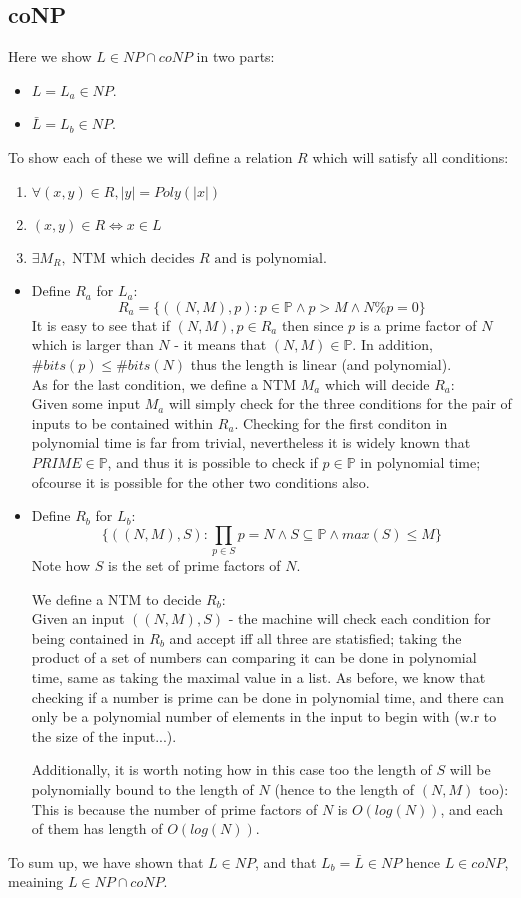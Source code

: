 \subsection{coNP}
Here we show $L\in NP\cap coNP$ in two parts:
\begin{itemize}
	\item $L=L_a\in NP$.
	\item $\bar{L}=L_b\in NP$.
\end{itemize}
To show each of these we will define a relation $R$ which will satisfy all
conditions:
\begin{enumerate}
	\item $\forall(x,y)\in R, |y|=Poly(|x|)$
	\item $(x,y)\in R \Leftrightarrow x\in L$
	\item $\exists M_R, \text{ NTM which decides } R \text{ and is polynomial}$.
\end{enumerate}
\begin{itemize}
	\item Define $R_a$ for $L_a$:
	\[R_a=\{((N,M),p):p\in\mathbb{P}\wedge p>M\wedge N\%p=0\}\]
	It is easy to see that if $(N,M),p\in R_a$ then since $p$ is a prime factor
	of $N$ which is larger than $N$ - it means that $(N,M)\in\mathbb{P}$.
	In addition, $\#bits(p)\leq\#bits(N)$ thus the length is linear (and polynomial).\\
	As for the last condition, we define a NTM $M_a$ which will decide $R_a$:\\
	Given some input $M_a$ will simply check for the three conditions for the pair
	of inputs to be contained within $R_a$. Checking for the first conditon in polynomial
	time is far from trivial, nevertheless it is widely known that $PRIME\in\mathbb{P}$,
	and thus it is possible to check if $p\in\mathbb{P}$ in polynomial time;
	ofcourse it is possible for the other two conditions also.
	
	\item Define $R_b$ for $L_b$:
	\[\{((N,M),S):\prod_{p\in S}p=N\wedge S\subseteq \mathbb{P}\wedge max(S)\leq M\}\]
	Note how $S$ is the set of prime factors of $N$.

	We define a NTM to decide $R_b$:\\
	Given an input $((N,M),S)$ - the machine will check each condition for being
	contained in $R_b$ and accept iff all three are statisfied; taking the product 
	of a set of numbers can comparing it can be done in polynomial time, same as taking the
	maximal value in a list. As before, we know that checking if a number is prime
	can be done in polynomial time, and there can only be a polynomial number of elements in
	the input to begin with (w.r to the size of the input...).
	
	Additionally, it is worth noting how in this case too the length of $S$ will be
	polynomially bound to the length of $N$ (hence to the length of $(N,M)$ too):
	This is because the number of prime factors of $N$ is $O(log(N))$,
	and each of them has length of $O(log(N))$.
\end{itemize}

To sum up, we have shown that $L\in NP$,
and that $L_b=\bar{L}\in NP$ hence $L\in coNP$,
meaining $L\in NP\cap coNP$.